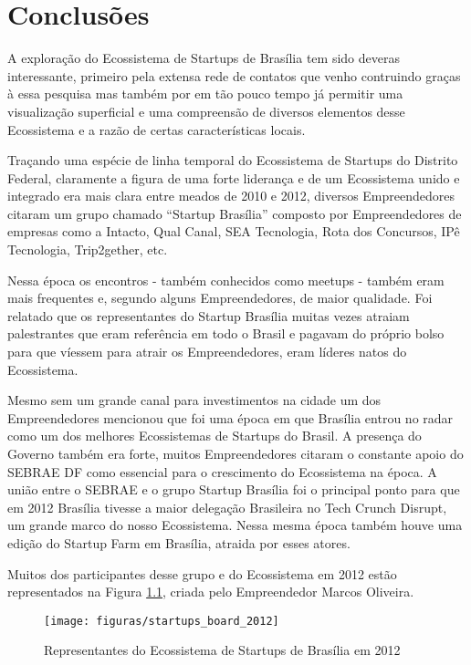 \chapter[Conclusões Pré-Eliminares]{Conclusões}
\label{cap-conclusoes}

A exploração do Ecossistema de Startups de Brasília tem sido deveras interessante, primeiro pela extensa rede de contatos que venho contruindo graças à essa pesquisa mas também por em tão pouco tempo já permitir uma visualização superficial e uma compreensão de diversos elementos desse Ecossistema e a razão de certas características locais.

Traçando uma espécie de linha temporal do Ecossistema de Startups do Distrito Federal, claramente a figura de uma forte liderança e de um Ecossistema unido e integrado era mais clara entre meados de 2010 e 2012, diversos Empreendedores citaram um grupo chamado ``Startup Brasília'' composto por Empreendedores de empresas como a Intacto, Qual Canal, SEA Tecnologia, Rota dos Concursos, IPê Tecnologia, Trip2gether, etc. 

Nessa época os encontros - também conhecidos como meetups - também eram mais frequentes e, segundo alguns Empreendedores, de maior qualidade. Foi relatado que os representantes do Startup Brasília muitas vezes atraiam palestrantes que eram referência em todo o Brasil e pagavam do próprio bolso para que víessem para atrair os Empreendedores, eram líderes natos do Ecossistema.

Mesmo sem um grande canal para investimentos na cidade um dos Empreendedores mencionou que foi uma época em que Brasília entrou no radar como um dos melhores Ecossistemas de Startups do Brasil. A presença do Governo também era forte, muitos Empreendedores citaram o constante apoio do SEBRAE DF como essencial para o crescimento do Ecossistema na época. A união entre o SEBRAE e o grupo Startup Brasília foi o principal ponto para que em 2012 Brasília tivesse a maior delegação Brasileira no Tech Crunch Disrupt, um grande marco do nosso Ecossistema. Nessa mesma época também houve uma edição do Startup Farm em Brasília, atraida por esses atores.

Muitos dos participantes desse grupo e do Ecossistema em 2012 estão representados na Figura \ref{figure:startups_board_2012}, criada pelo Empreendedor Marcos Oliveira.

\begin{figure}[!htb]
	\centering
	\texttt{[image: figuras/startups\_board\_2012]}
	\caption{Representantes do Ecossistema de Startups de Brasília em 2012}
	\label{figure:startups_board_2012}
\end{figure}

